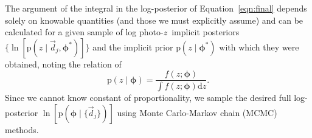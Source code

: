 \documentclass[iop]{emulateapj}
\newcommand{\Eq}[1]{Equation~\ref{#1}}
\newcommand{\data}{\ensuremath{\vec{d}}}%
\newcommand{\pr}[1]{\ensuremath{\mathrm{p}(#1)}}%
\newcommand{\gvn}{\mid}%
\newcommand{\integral}[2]{\ensuremath{\int #1 \mathrm{d} #2}}
\newcommand{\pz}{photo-$z$}
\newcommand{\pzip}{\pz\ implicit posterior}
\newcommand{\bvec}[1]{\ensuremath{\boldsymbol{#1}}}%
\newcommand{\ndphi}{\bvec{\phi}}
\begin{document}
The argument of the integral in the log-posterior of \Eq{eqn:final} depends solely on knowable quantities (and those we must explicitly assume) and can be calculated for a given sample of log \pzip s $\{\ln[\pr{z \gvn \data_{j}, \ndphi^{*}}]\}$ and the implicit prior $\pr{z \gvn \ndphi^{*}}$ with which they were obtained, noting the relation of 
\begin{equation}
\label{eqn:params}
\pr{z \gvn \ndphi} = \frac{f(z; \ndphi)}{\integral{f(z; \ndphi)}{z}}.
\end{equation}
Since we cannot know constant of proportionality, we sample the desired full log-posterior $\ln[\pr{\ndphi \gvn \{\data_{j}\}}]$ using Monte Carlo-Markov chain (MCMC) methods.  

%
\end{document}
